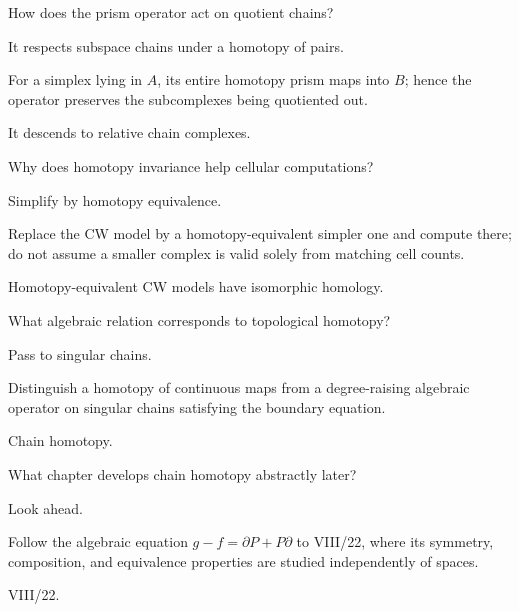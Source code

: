 \begin{exercise}\label{exr:viii20-20}
How does the prism operator act on quotient chains?
\end{exercise}
\begin{hint}
It respects subspace chains under a homotopy of pairs.

For a simplex lying in \(A\), its entire homotopy prism maps into \(B\); hence the operator preserves the subcomplexes being quotiented out.
\end{hint}
\begin{solution}
It descends to relative chain complexes.
\end{solution}

\begin{exercise}\label{exr:viii20-21}
Why does homotopy invariance help cellular computations?
\end{exercise}
\begin{hint}
Simplify by homotopy equivalence.

Replace the CW model by a homotopy-equivalent simpler one and compute there; do not assume a smaller complex is valid solely from matching cell counts.
\end{hint}
\begin{solution}
Homotopy-equivalent CW models have isomorphic homology.
\end{solution}

\begin{exercise}\label{exr:viii20-22}
What algebraic relation corresponds to topological homotopy?
\end{exercise}
\begin{hint}
Pass to singular chains.

Distinguish a homotopy of continuous maps from a degree-raising algebraic operator on singular chains satisfying the boundary equation.
\end{hint}
\begin{solution}
Chain homotopy.
\end{solution}

\begin{exercise}\label{exr:viii20-23}
What chapter develops chain homotopy abstractly later?
\end{exercise}
\begin{hint}
Look ahead.

Follow the algebraic equation \(g-f=\partial P+P\partial\) to VIII/22, where its symmetry, composition, and equivalence properties are studied independently of spaces.
\end{hint}
\begin{solution}
VIII/22.
\end{solution}

